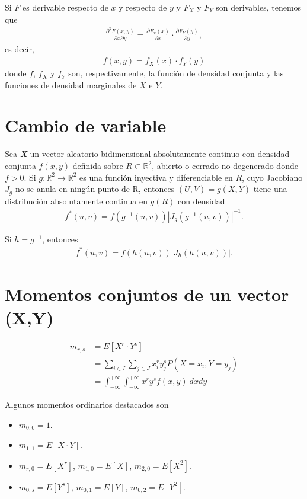 Si $F$ es derivable respecto de $x$ y respecto de $y$ y $F_X$ y $F_Y$ son derivables, tenemos que
\begin{align*}
    \frac{\partial^2 F(x,y)}{\partial x \partial y} = \frac{\partial F_x(x)}{\partial x} \cdot \frac{\partial F_Y(y)}{\partial y},
\end{align*}
es decir,
\begin{align*}
    f(x,y) = f_X(x) \cdot f_Y(y)
\end{align*}
donde $f$, $f_X$ y $f_Y$ son, respectivamente, la función de densidad conjunta y las funciones de densidad marginales de $X$ e $Y$.

\section{Cambio de variable}

\begin{prop}
    Sea \textbf{\textit{X}} un vector aleatorio bidimensional absolutamente continuo con densidad conjunta $f(x,y)$ definida sobre $R \subset \mathbb{R}^2$, abierto o cerrado no degenerado donde $f > 0$. Si $g : \mathbb{R}^2 \longrightarrow \mathbb{R}^2$ es una función inyectiva y diferenciable en $R$, cuyo Jacobiano $J_g$ no se anula en ningún punto de R, entonces $(U,V) = g(X,Y)$ tiene una distribución absolutamente continua en $g(R)$ con densidad
    \begin{align*}
        f^*(u,v) = f(g^{-1}(u,v))|J_g(g^{-1}(u,v))|^{-1}.
    \end{align*}
\end{prop}
Si $h = g^{-1}$, entonces
\begin{align*}
    f^*(u,v) = f(h(u,v))|J_h(h(u,v))|.
\end{align*}

\section{Momentos conjuntos de un vector (X,Y)}
\begin{defi}
    \begin{align*}
        m_{r,s} & = E[X^r \cdot Y^s]                                                        \\
                & = \sum_{i\in I}{\sum_{j \in J}{x_i^ry_j^sP(X = x_i, Y = y_j)}}            \\
                & = \int_{-\infty}^{+\infty}{\int_{-\infty}^{+\infty}{x^ry^sf(x,y) \ dxdy}}
    \end{align*}
\end{defi}
Algunos momentos ordinarios destacados son
\begin{itemize}
    \item $m_{0,0} = 1$.
    \item $m_{1,1} = E[X \cdot Y]$.
    \item $m_{r,0} = E[X^r]$, $m_{1,0} = E[X]$, $m_{2,0} = E[X^2]$.
    \item $m_{0,s} = E[Y^s]$, $m_{0,1} = E[Y]$, $m_{0,2} = E[Y^2]$.
\end{itemize}

